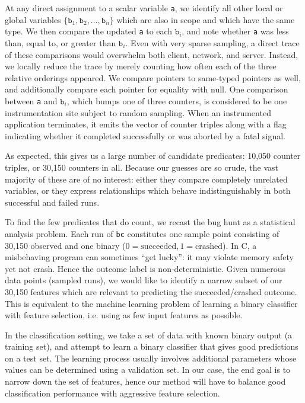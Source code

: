 At any direct assignment to a scalar variable \texttt{a}, we identify
all other local or global variables $\{ \mathtt{b}_1, \mathtt{b}_2,
\dots, \mathtt{b}_n \}$ which are also in scope and which have the
same type.  We then compare the updated \texttt{a} to each
$\mathtt{b}_i$, and note whether \texttt{a} was less than, equal to,
or greater than $\mathtt{b}_i$.  Even with very sparse sampling, a
direct trace of these comparisons would overwhelm both client,
network, and server.  Instead, we locally reduce the trace by merely
counting how often each of the three relative orderings appeared.  We
compare pointers to same-typed pointers as well, and additionally
compare each pointer for equality with null.  One comparison between
\texttt{a} and $\mathtt{b}_i$, which bumps one of three counters, is
considered to be one instrumentation site subject to random sampling.
When an instrumented application terminates, it emits the vector of
counter triples along with a flag indicating whether it completed
successfully or was aborted by a fatal signal.

As expected, this gives us a large number of candidate predicates:
10,050 counter triples, or 30,150 counters in all.  Because our
guesses are so crude, the vast majority of these are of no interest:
either they compare completely unrelated variables, or they express
relationships which behave indistinguishably in both successful and
failed runs.

To find the few predicates that do count, we recast the bug hunt as a
statistical analysis problem.  Each run of \texttt{bc} constitutes one
sample point consisting of 30,150 observed  and one
binary  ($0 = \text{succeeded}, 1 = \text{crashed}$).
In C, a misbehaving program can sometimes ``get lucky'': it may
violate memory safety yet not crash.  Hence the outcome label is
non-deterministic.  Given numerous data points (sampled runs), we
would like to identify a narrow subset of our 30,150 features which
are relevant to predicting the succeeded/crashed outcome.  This is
equivalent to the machine learning problem of learning a binary
classifier with feature selection, i.e. using as few input features as
possible.

In the classification setting, we take a set of data
with known binary output (a training set), and attempt to learn a
binary classifier that gives good predictions on a test set.  The
learning process usually involves additional parameters whose values can
be determined using a validation set.  In our case, the end goal is to
narrow down the set of features, hence our method will have to balance
good classification performance with aggressive feature selection.

